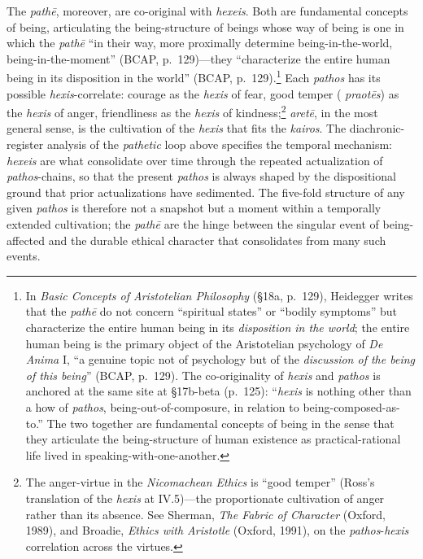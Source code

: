 The \textit{pathē}, moreover, are co-original with \textit{hexeis}. Both are fundamental concepts of being, articulating the being-structure of beings whose way of being is one in which the \textit{pathē} ``in their way, more proximally determine being-in-the-world, being-in-the-moment'' (BCAP, p.~129)---they ``characterize the entire human being in its disposition in the world'' (BCAP, p.~129).\footnote{In \textit{Basic Concepts of Aristotelian Philosophy} (\S 18a, p.~129), Heidegger writes that the \textit{pathē} do not concern ``spiritual states'' or ``bodily symptoms'' but characterize the entire human being in its \textit{disposition in the world}; the entire human being is the primary object of the Aristotelian psychology of \textit{De Anima} I, ``a genuine topic not of psychology but of the \textit{discussion of the being of this being}'' (BCAP, p.~129). The co-originality of \textit{hexis} and \textit{pathos} is anchored at the same site at \S 17b-beta (p.~125): ``\textit{hexis} is nothing other than a how of \textit{pathos}, being-out-of-composure, in relation to being-composed-as-to.'' The two together are fundamental concepts of being in the sense that they articulate the being-structure of human existence as practical-rational life lived in speaking-with-one-another.} Each \textit{pathos} has its possible \textit{hexis}-correlate: courage as the \textit{hexis} of fear, good temper ( \textit{praotēs}) as the \textit{hexis} of anger, friendliness as the \textit{hexis} of kindness;\footnote{The anger-virtue in the \textit{Nicomachean Ethics} is ``good temper'' (Ross's translation of the \textit{hexis} at IV.5)---the proportionate cultivation of anger rather than its absence. See Sherman, \textit{The Fabric of Character} (Oxford, 1989), and Broadie, \textit{Ethics with Aristotle} (Oxford, 1991), on the \textit{pathos}-\textit{hexis} correlation across the virtues.} \textit{aretē}, in the most general sense, is the cultivation of the \textit{hexis} that fits the \textit{kairos}. The diachronic-register analysis of the \textit{pathetic} loop above specifies the temporal mechanism: \textit{hexeis} are what consolidate over time through the repeated actualization of \textit{pathos}-chains, so that the present \textit{pathos} is always shaped by the dispositional ground that prior actualizations have sedimented. The five-fold structure of any given \textit{pathos} is therefore not a snapshot but a moment within a temporally extended cultivation; the \textit{pathē} are the hinge between the singular event of being-affected and the durable ethical character that consolidates from many such events.

